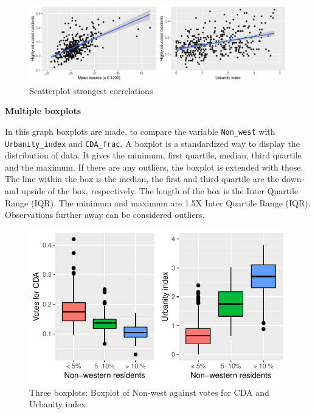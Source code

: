 \documentclass[11pt,]{article}
\begin{document}
\begin{figure}[H]

{\centering \includegraphics{Report_files/figure-latex/unnamed-chunk-6-1} 

}

\caption{\label{5}Scatterplot strongest correlations}\label{fig:unnamed-chunk-6}
\end{figure}

\textbf{Multiple boxplots}

In this graph boxplots are made, to compare the variable
\texttt{Non\_west} with \texttt{Urbanity\_index} and \texttt{CDA\_frac}.
A boxplot is a standardized way to display the distribution of data. It
gives the minimum, first quartile, median, third quartile and the
maximum. If there are any outliers, the boxplot is extended with those.
The line within the box is the median, the first and third quartile are
the down- and upside of the box, respectively. The length of the box is
the Inter Quartile Range (IQR). The minimum and maximum are 1.5X Inter
Quartile Range (IQR). Observations further away can be considered
outliers.

\begin{figure}[H]

{\centering \includegraphics{Report_files/figure-latex/unnamed-chunk-7-1} 

}

\caption{\label{6}Three boxplots: Boxplot of Non-west against votes for CDA and Urbanity index}\label{fig:unnamed-chunk-7}
\end{figure}
\end{document}
